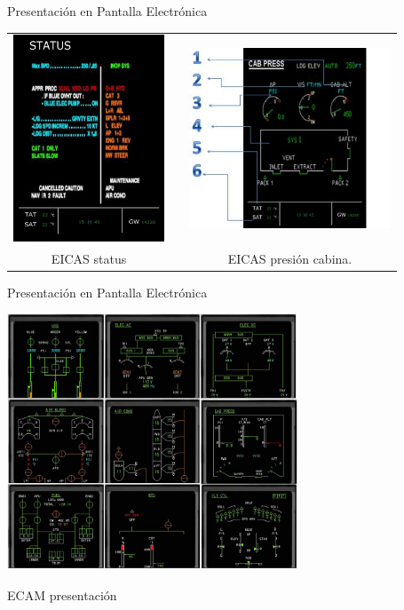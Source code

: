 \documentclass[10pt]{beamer}
\begin{document}
\begin{frame}{Presentaci\'on en Pantalla Electr\'onica}
  \begin{tabular}{ccc}
	\includegraphics[width=4.5cm]{imagenes/1.4.pantalla.electronica/eicas_status.jpg}
	& \hspace{3mm} &
\includegraphics[width=6cm]{imagenes/1.4.pantalla.electronica/eicas_presion_cabina.jpg}
	\\
   	EICAS status & 
	& EICAS presi\'on cabina.  
	\\
\end{tabular}

\end{frame}


\begin{frame}{Presentaci\'on en Pantalla Electr\'onica}
  \begin{center}
    \includegraphics[width=0.65\textwidth]{imagenes/1.4.pantalla.electronica/ecam_airbus.jpg}

    \vspace{3mm}

    ECAM presentaci\'on
  \end{center}
\end{frame}
\end{document}
